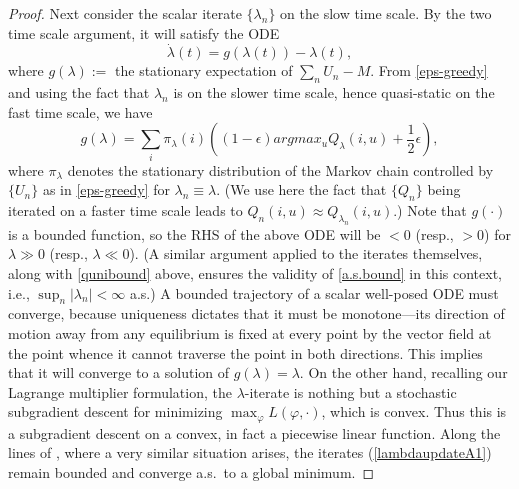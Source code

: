 \documentclass[12pt]{article}
\numberwithin{equation}{section}
\newcommand{\1}{\textbf{1}}
\begin{document}
\begin{proof}
Next consider the scalar iterate $\{\lambda_n\}$ on the slow time scale. By the two time scale argument, 
it will satisfy the ODE
$$\dot{\lambda}(t) = g(\lambda(t)) - \lambda(t),$$
where $g(\lambda) :=$ the stationary expectation of $\sum_nU_n - M$.  From \eqref{eps-greedy} and using the fact that $\lambda_n$ is on the slower time scale, hence quasi-static on the fast time scale, we have
$$g(\lambda) = \sum_i\pi_\lambda(i)\left((1-\epsilon)argmax_uQ_\lambda(i,u) + \frac{1}{2}\epsilon\right),$$
where $\pi_{\lambda}$ denotes the stationary distribution of the Markov chain controlled by $\{U_n\}$ as in \eqref{eps-greedy} for $\lambda_n \equiv \lambda$.  (We use here the fact that $\{Q_n\}$ being iterated on a faster time scale leads to $Q_n(i,u) \approx Q_{\lambda_n}(i,u)$.) Note that $g(\cdot)$ is a bounded function, so the RHS of the above ODE will be $< 0$ (resp., $> 0$) for $\lambda \gg 0$ (resp., $\lambda \ll 0$). (A similar argument applied to the iterates themselves, along with \eqref{qunibound} above,  ensures the validity of \eqref{a.s.bound} in this context, i.e., $\sup_n| \lambda_n| < \infty$ a.s.)  A bounded trajectory of a scalar well-posed ODE must converge, because uniqueness dictates that it must be monotone---its direction of motion away from any equilibrium is fixed at every point by the vector field at the  point whence it cannot traverse the point in both directions. This implies that it will converge to a solution of $g(\lambda) = \lambda$. On the other hand, recalling our Lagrange multiplier formulation, the $\lambda$-iterate is nothing but a stochastic subgradient descent for minimizing $\max_\varphi L(\varphi, \cdot)$, which is convex. Thus this is a subgradient descent on a convex, in fact a piecewise linear function.
Along the lines of \cite{Avrachenkov2}, where a very similar situation arises, the iterates (\ref{lambdaupdateA1}) remain bounded 
and converge a.s.\ to a global minimum. 



\end{proof}
\end{document}

